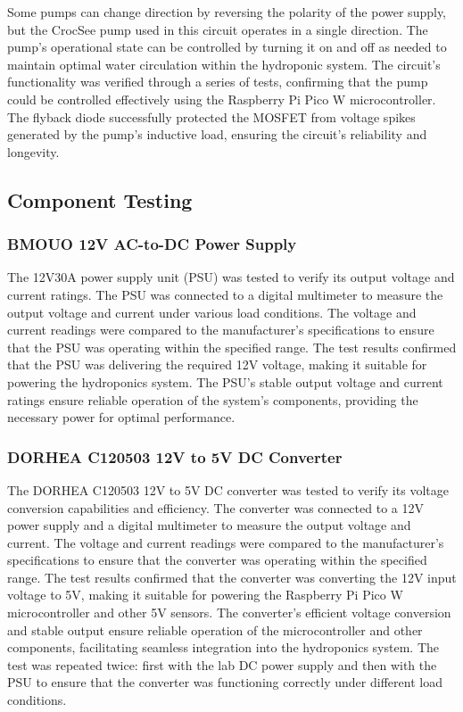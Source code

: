 \documentclass[12pt]{article} %
\begin{document}
\newline
\newline
\noindent Some pumps can change direction by reversing the polarity of the power supply, but the CrocSee pump used in this circuit operates in a single direction. The pump's operational state can be controlled by turning it on and off as needed to maintain optimal water circulation within the hydroponic system. The circuit's functionality was verified through a series of tests, confirming that the pump could be controlled effectively using the Raspberry Pi Pico W microcontroller. The flyback diode successfully protected the MOSFET from voltage spikes generated by the pump's inductive load, ensuring the circuit's reliability and longevity.

\subsection{Component Testing}
\subsubsection{BMOUO 12V AC-to-DC Power Supply}
\noindent The 12V30A power supply unit (PSU) was tested to verify its output voltage and current ratings. The PSU was connected to a digital multimeter to measure the output voltage and current under various load conditions. The voltage and current readings were compared to the manufacturer's specifications to ensure that the PSU was operating within the specified range. The test results confirmed that the PSU was delivering the required 12V voltage, making it suitable for powering the hydroponics system. The PSU's stable output voltage and current ratings ensure reliable operation of the system's components, providing the necessary power for optimal performance.
\subsubsection{DORHEA C120503 12V to 5V DC Converter}
\noindent The DORHEA C120503 12V to 5V DC converter was tested to verify its voltage conversion capabilities and efficiency. The converter was connected to a 12V power supply and a digital multimeter to measure the output voltage and current. The voltage and current readings were compared to the manufacturer's specifications to ensure that the converter was operating within the specified range. The test results confirmed that the converter was converting the 12V input voltage to 5V, making it suitable for powering the Raspberry Pi Pico W microcontroller and other 5V sensors. The converter's efficient voltage conversion and stable output ensure reliable operation of the microcontroller and other components, facilitating seamless integration into the hydroponics system. The test was repeated twice: first with the lab DC power supply and then with the PSU to ensure that the converter was functioning correctly under different load conditions.
\end{document}
